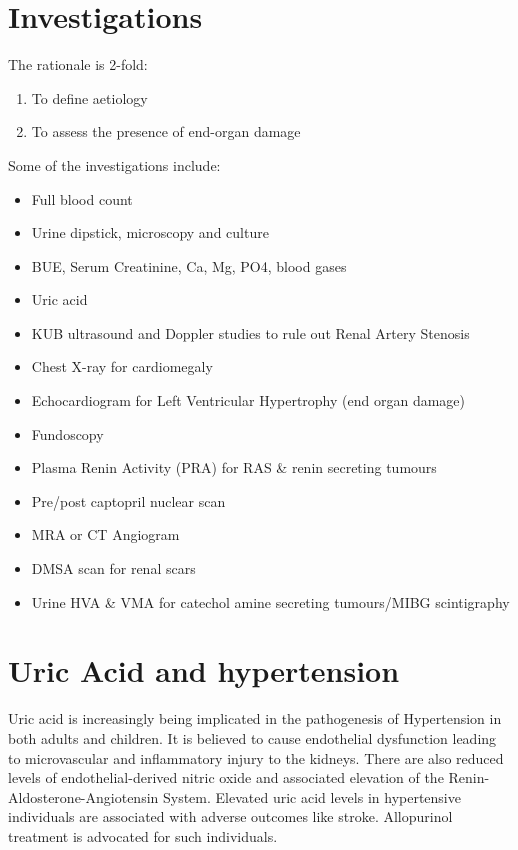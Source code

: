 \documentclass[
  letterpaper,
  DIV=11,
  numbers=noendperiod]{scrreprt}
\providecommand{\tightlist}{%
  \setlength{\itemsep}{0pt}\setlength{\parskip}{0pt}}\usepackage{longtable,booktabs,array}
\begin{document}
\hypertarget{investigations-2}{%
\section{Investigations}\label{investigations-2}}

The rationale is 2-fold:

\begin{enumerate}
\def\labelenumi{\arabic{enumi}.}
\tightlist
\item
  To define aetiology
\item
  To assess the presence of end-organ damage
\end{enumerate}

Some of the investigations include:

\begin{itemize}
\tightlist
\item
  Full blood count
\item
  Urine dipstick, microscopy and culture
\item
  BUE, Serum Creatinine, Ca, Mg, PO4, blood gases
\item
  Uric acid
\item
  KUB ultrasound and Doppler studies to rule out Renal Artery Stenosis
\item
  Chest X-ray for cardiomegaly
\item
  Echocardiogram for Left Ventricular Hypertrophy (end organ damage)
\item
  Fundoscopy
\item
  Plasma Renin Activity (PRA) for RAS \& renin secreting tumours
\item
  Pre/post captopril nuclear scan
\item
  MRA or CT Angiogram
\item
  DMSA scan for renal scars
\item
  Urine HVA \& VMA for catechol amine secreting tumours/MIBG
  scintigraphy
\end{itemize}

\hypertarget{uric-acid-and-hypertension}{%
\section{Uric Acid and hypertension}\label{uric-acid-and-hypertension}}

Uric acid is increasingly being implicated in the pathogenesis of
Hypertension in both adults and children. It is believed to cause
endothelial dysfunction leading to microvascular and inflammatory injury
to the kidneys. There are also reduced levels of endothelial-derived
nitric oxide and associated elevation of the
Renin-Aldosterone-Angiotensin System. Elevated uric acid levels in
hypertensive individuals are associated with adverse outcomes like
stroke. Allopurinol treatment is advocated for such individuals.
\end{document}
